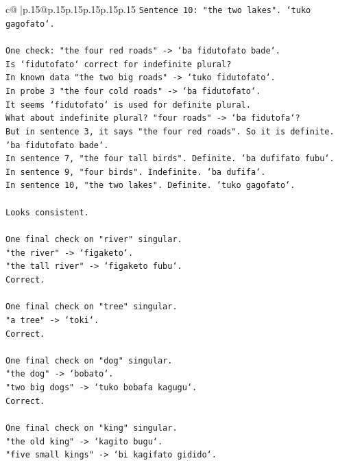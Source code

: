 \documentclass{article}
\begin{document}
{\begin{supertabular}{c@{$\;$}|p{.15\linewidth}@{}p{.15\linewidth}p{.15\linewidth}p{.15\linewidth}p{.15\linewidth}p{.15\linewidth}}
{{{\texttt{Sentence 10: "the two lakes". `tuko gagofato`.} \\
\\ 
\texttt{One check: "the four red roads" {-}> `ba fidutofato bade`.} \\
\texttt{Is `fidutofato` correct for indefinite plural?} \\
\texttt{In known data "the two big roads" {-}> `tuko fidutofato`.} \\
\texttt{In probe 3 "the four cold roads" {-}> `ba fidutofato`.} \\
\texttt{It seems `fidutofato` is used for definite plural.} \\
\texttt{What about indefinite plural? "four roads" {-}> `ba fidutofa`?} \\
\texttt{But in sentence 3, it says "the four red roads". So it is definite. `ba fidutofato bade`.} \\
\texttt{In sentence 7, "the four tall birds". Definite. `ba dufifato fubu`.} \\
\texttt{In sentence 9, "four birds". Indefinite. `ba dufifa`.} \\
\texttt{In sentence 10, "the two lakes". Definite. `tuko gagofato`.} \\
\\ 
\texttt{Looks consistent.} \\
\\ 
\texttt{One final check on "river" singular.} \\
\texttt{"the river" {-}> `figaketo`.} \\
\texttt{"the tall river" {-}> `figaketo fubu`.} \\
\texttt{Correct.} \\
\\ 
\texttt{One final check on "tree" singular.} \\
\texttt{"a tree" {-}> `toki`.} \\
\texttt{Correct.} \\
\\ 
\texttt{One final check on "dog" singular.} \\
\texttt{"the dog" {-}> `bobato`.} \\
\texttt{"two big dogs" {-}> `tuko bobafa kagugu`.} \\
\texttt{Correct.} \\
\\ 
\texttt{One final check on "king" singular.} \\
\texttt{"the old king" {-}> `kagito bugu`.} \\
\texttt{"five small kings" {-}> `bi kagifato gidido`.} \\
}}}
\end{supertabular}}
\end{document}
